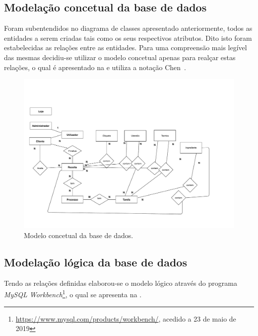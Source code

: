 \subsection{Modelação concetual da base de dados}
\label{sec:sbd:concetual:ent-rel-atr}

Foram subentendidos no diagrama de classes apresentado anteriormente, todos as entidades a serem criadas tais como os seus respectivos atributos.
Dito isto foram estabelecidas as relações entre as entidades. Para uma compreensão mais legível das mesmas decidiu-se utilizar o modelo concetual apenas para realçar estas relações, o qual é apresentado na  e utiliza a notação Chen~\parencite{chen1976entity}.

\begin{figure}[ht]
  \centering
  \includegraphics[width=\textwidth]{figures/09/sbd-concetual.pdf}
  \caption{Modelo concetual da base de dados.}
  \label{fig:concetuallllll}
\end{figure}


\subsection{Modelação lógica da base de dados}
\label{sec:sbd:logico}

Tendo as relações definidas elaborou-se o modelo lógico através do programa \emph{MySQL Workbench}\footnote{\url{https://www.mysql.com/products/workbench/}, acedido a 23 de maio de 2019}, o qual se apresenta na .

